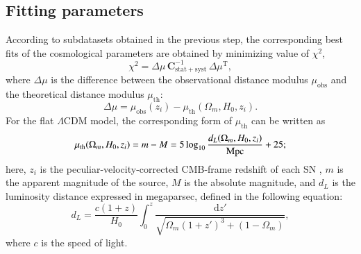 \documentclass{aa}
\begin{document}
\subsection{Fitting parameters}
According to subdatasets obtained in the previous step, the corresponding best fits of the cosmological parameters are obtained by minimizing value of $\chi^{2}$,
\begin{equation}
        \chi^{2} = \Delta \mu \, \mathbf{C}^{-1}_\mathrm{stat+syst} \, \Delta \mu ^\mathrm{T} ,
        \label{chi}
\end{equation}
where $\Delta \mu$ is the difference between the observational distance modulus $\mu_\mathrm{obs}$ and the theoretical distance modulus $\mu_\mathrm{th}$:
\begin{equation}
        \Delta \mu = \mu_\mathrm{obs}(z_{i}) - \mu_\mathrm{th}(\Omega_{m}, H_{0},z_{i}) . 
        \label{Dmu}
\end{equation}
For the flat $\Lambda$CDM model, the corresponding form of $\mu_\mathrm{th}$ can be written as 
\begin{equation}
        \mu_\mathrm{th}(\Omega_{m}, H_{0},z_{i}) = m - M = 5 \log_{10} \frac{d_{L}(\Omega_{m}, H_{0},z_{i})}{\textnormal{Mpc}} + 25;
        \label{mu}
\end{equation}
here, $z_{i}$ is the peculiar-velocity-corrected CMB-frame redshift of each SN \citep{2022PASA...39...46C}, $m$ is the apparent magnitude of the source, $M$ is the absolute magnitude, and $d_{L}$ is the luminosity distance expressed in megaparsec, defined in the following equation: 
\begin{equation}
        d_{L} = \frac{c(1+z)}{H_{0}} \int_{0}^{z} 
        \frac{\mathrm{d} z'}{\sqrt{\Omega_{m} (1+z')^{3} + (1-\Omega_{m})}},
        \label{dl}
\end{equation}
where $c$ is the speed of light. 
\end{document}
